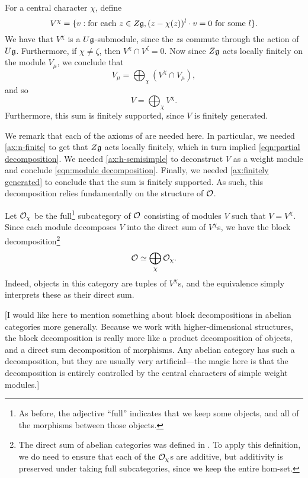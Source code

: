 \documentclass[11pt]{article}
\begin{document}
For a central character $\chi$, define \[
	V^\chi = \{v:  \text{for each $z\in Z\mathfrak{g}$}, (z - \chi(z))^l\cdot v =
	0\text{ for some $l$}\}.
\]
We have that $V^\chi$ is a $U\mathfrak{g}$-submodule, since the $z$s commute through the
action of $U\mathfrak{g}$. Furthermore, if $\chi\neq\zeta$, then $V^\chi\cap V^\zeta =
	0$. Now since $Z\mathfrak{g}$ acts locally finitely on the module $V_\mu$, we conclude
that \begin{equation}\label{eqn:partial decomposition}
	V_\mu = \bigoplus_\chi (V^\chi\cap V_\mu),
\end{equation}and so \begin{equation}\label{eqn:module decomposition}
	V = \bigoplus_\chi V^\chi.
\end{equation}Furthermore, this sum is finitely supported, since $V$ is
finitely generated.

We remark that each of the axioms of  are needed here.
In particular, we needed \ref{ax:n-finite} to get that $Z\mathfrak{g}$ acts locally
finitely, which in turn implied \eqref{eqn:partial decomposition}. We needed
\ref{ax:h-semisimple} to deconstruct $V$ as a weight module and conclude
\eqref{eqn:module decomposition}. Finally, we needed \ref{ax:finitely generated}
to conclude that the sum is finitely supported. As such, this decomposition
relies fundamentally on the structure of $\mathcal{O}$.

Let $\mathcal{O}_\chi$ be the full\footnote{
	As before, the adjective ``full'' indicates that we keep some objects, and all of
	the morphisms between those objects.
} subcategory of $\mathcal{O}$ consisting of modules $V$ such
that $V = V^\chi$. Since each module decomposes $V$ into the direct sum of
$V^\chi$s, we have the block decomposition\footnote{The direct sum of
	abelian categories was defined in . To apply this
	definition, we do need to ensure that each of the $\mathcal{O}_\chi$s are
	additive, but additivity is preserved under taking full subcategories, since
	we keep the entire hom-set.} \[
	\mathcal{O} \simeq \bigoplus_\chi \mathcal{O}_\chi.
\]Indeed, objects in this category are tuples of $V^\chi$s, and the equivalence
simply interprets these as their direct sum.

	[I would like here to mention something about block decompositions in abelian
		categories more generally. Because we work with higher-dimensional structures,
		the block decomposition is really more like a product decomposition of objects,
		and a direct sum decomposition of morphisms. Any abelian category has such a
		decomposition, but they are usually very artificial---the magic here is that the
		decomposition is entirely controlled by the central characters of simple weight
		modules.]
\end{document}
